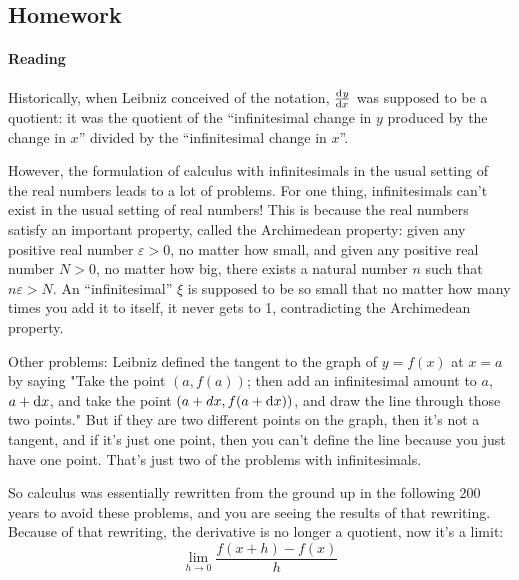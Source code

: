 \subsection{Homework}
\paragraph{Reading}
Historically, when Leibniz conceived of the notation, $ \od{y}{x} $ was supposed to be a quotient: it was the quotient of the ``infinitesimal change in $y$ produced by the change in $x$'' divided by the ``infinitesimal change in $x$''.

However, the formulation of calculus with infinitesimals in the usual setting of the real numbers leads to a lot of problems. For one thing, infinitesimals can't exist in the usual setting of real numbers! This is because the real numbers satisfy an important property, called the Archimedean property: given any positive real number $ \varepsilon > 0 $, no matter how small, and given any positive real number $ N > 0 $, no matter how big, there exists a natural number $n$ such that $n \varepsilon > N$. An ``infinitesimal'' $ \xi $ is supposed to be so small that no matter how many times you add it to itself, it never gets to 1, contradicting the Archimedean property.

Other problems: Leibniz defined the tangent to the graph of $y=f(x)$ at $x=a$ by saying "Take the point $(a,f(a))$; then add an infinitesimal amount to $a$, $a+\dif{x}$, and take the point $(a+dx,f(a+\dif{x}))$, and draw the line through those two points." But if they are two different points on the graph, then it's not a tangent, and if it's just one point, then you can't define the line because you just have one point. That's just two of the problems with infinitesimals.

So calculus was essentially rewritten from the ground up in the following 200 years to avoid these problems, and you are seeing the results of that rewriting. Because of that rewriting, the derivative is no longer a quotient, now it's a limit:
\begin{displaymath}
  \lim_{h \to 0} \frac{f(x + h) - f(x)}{h}
\end{displaymath}

